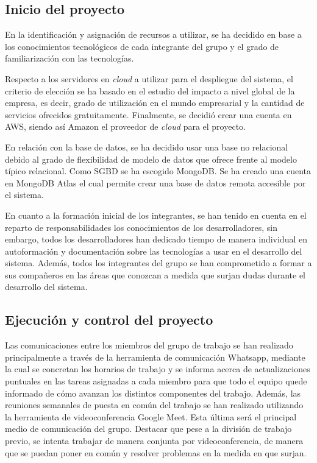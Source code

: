 \documentclass{article}
\begin{document}
\subsection{Inicio del proyecto}

En la identificación y asignación de recursos a utilizar, se ha decidido en base a los conocimientos tecnológicos de cada integrante del grupo y el grado de familiarización con las tecnologías. 

Respecto a los servidores en \textit{cloud} a utilizar para el despliegue del sistema, el criterio de elección se ha basado en el estudio del impacto a nivel global de la empresa, es decir, grado de utilización en el mundo empresarial y la cantidad de servicios ofrecidos gratuitamente. Finalmente, se decidió crear una cuenta en AWS, siendo así Amazon el proveedor de \textit{cloud} para el proyecto.

En relación con la base de datos, se ha decidido usar una base no relacional debido al grado de flexibilidad de modelo de datos que ofrece frente al modelo típico relacional. Como SGBD se ha escogido MongoDB. Se ha creado una cuenta en MongoDB Atlas el cual permite crear una base de datos remota accesible por el sistema.

En cuanto a la formación inicial de los integrantes, se han tenido en cuenta en el reparto de responsabilidades los conocimientos de los desarrolladores, sin embargo, todos los desarrolladores han dedicado tiempo de manera individual en autoformación y documentación sobre las tecnologías a usar en el desarrollo del sistema. Además, todos los integrantes del grupo se han comprometido a formar a sus compañeros en las áreas que conozcan a medida que surjan dudas durante el desarrollo del sistema.

\subsection{Ejecución y control del proyecto}

Las comunicaciones entre los miembros del grupo de trabajo se han realizado principalmente a través de la herramienta de comunicación Whatsapp, mediante la cual se concretan los horarios de trabajo y se informa acerca de actualizaciones puntuales en las tareas asignadas a cada miembro para que todo el equipo quede informado de cómo avanzan los distintos componentes del trabajo. Además, las reuniones semanales de puesta en común del trabajo se han realizado utilizando la herramienta de videoconferencia Google Meet. Esta última será el principal medio de comunicación del grupo. Destacar que pese a la división de trabajo previo, se intenta trabajar de manera conjunta por videoconferencia, de manera que se puedan poner en común y resolver problemas en la medida en que surjan.
\end{document}
